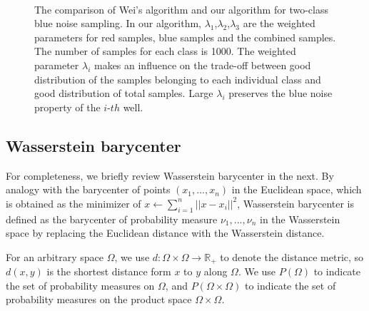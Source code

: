 \begin{figure*}[htb]
\centering
{}%
\hspace{0.1in}
\\
%
\hspace{0.1in}
%
\caption{The comparison of Wei's algorithm and our algorithm for two-class blue noise sampling.
In our algorithm, $\lambda_1$,$\lambda_2$,$\lambda_3$ are the weighted parameters for red samples, blue samples and the combined samples.
The number of samples for each class is 1000.
The weighted parameter $\lambda_i$ makes an influence on the trade-off between good distribution of the samples belonging to each individual class and good distribution of total samples.
Large $\lambda_i$ preserves the blue noise property of the $i$-$th$ well.
}\label{two-class-sampling}
\end{figure*}
\subsection{Wasserstein barycenter}
For completeness, we briefly review Wasserstein barycenter in the next.
By analogy with the barycenter of points $(x_1,...,x_n)$ in the Euclidean space, which is obtained as the minimizer of $x\leftarrow\sum_{i=1}^n||x-x_i||^2$,
Wasserstein barycenter is defined as the barycenter of probability measure $\nu_1,...,\nu_n$ in the Wasserstein space
by replacing the Euclidean distance with the Wasserstein distance.

For an arbitrary space $\Omega$,
we use $d:\Omega\times\Omega\rightarrow{\mathbb{R}}_+$ to denote the distance metric,
so $d(x,y)$ is the shortest distance form $x$ to $y$ along $\Omega$.
We use $P(\Omega)$ to indicate the set of probability measures on $\Omega$,
and $P(\Omega\times\Omega)$ to indicate the set of probability measures on the product space $\Omega\times\Omega$.

